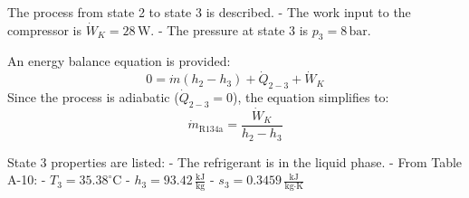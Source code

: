 The process from state 2 to state 3 is described.  
- The work input to the compressor is \( \dot{W}_K = 28 \, \text{W} \).  
- The pressure at state 3 is \( p_3 = 8 \, \text{bar} \).  

An energy balance equation is provided:  
\[
0 = \dot{m} \left( h_2 - h_3 \right) + \dot{Q}_{2-3} + \dot{W}_K
\]  
Since the process is adiabatic (\( \dot{Q}_{2-3} = 0 \)), the equation simplifies to:  
\[
\dot{m}_{\text{R134a}} = \frac{\dot{W}_K}{h_2 - h_3}
\]  

State 3 properties are listed:  
- The refrigerant is in the liquid phase.  
- From Table A-10:  
  - \( T_3 = 35.38^\circ\text{C} \)  
  - \( h_3 = 93.42 \, \frac{\text{kJ}}{\text{kg}} \)  
  - \( s_3 = 0.3459 \, \frac{\text{kJ}}{\text{kg·K}} \)